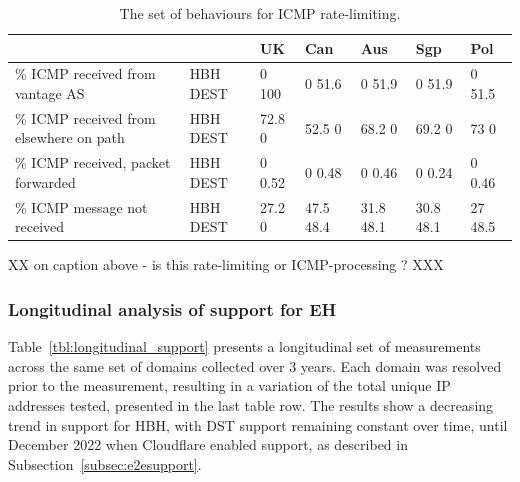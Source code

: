 \documentclass[conference]{IEEEtran}
\begin{document}
\begin{table}
\begin{tabular}{p{}|p{}|p{}|p{}|p{}|p{}|p{}}

\centering

                                           &             & UK        & Can       & Aus    & Sgp          & Pol     \\
                                           \hline

{\% ICMP received from vantage AS}        & {HBH DEST} & {0 100}  & {0 51.6}    & {0 51.9}    & {0 51.9}    & {0 51.5}  \\
\hline
{\% ICMP received from elsewhere on path}          & {HBH DEST} & {72.8 0} & {52.5 0}    & {68.2 0}    & {69.2 0}    & {73  0}    \\
\hline

{\% ICMP received, packet forwarded}          & {HBH DEST} & {0 0.52} & {0 0.48}    & {0 0.46}    & {0 0.24}    & {0 0.46}  \\
\hline

{\% ICMP message not received} & {HBH DEST} & {27.2 0} & {47.5 48.4} & {31.8 48.1} & {30.8 48.1} & {27 48.5} 
\end{tabular}
\caption{The set of behaviours for ICMP rate-limiting.}
\label{tbl:icmp_support_dst}
\end{table}



XX on caption above - is this rate-limiting or ICMP-processing ? XXX

\subsubsection{Longitudinal analysis of support for EH}

Table~\ref{tbl:longitudinal_support} presents a longitudinal set of measurements across the same set of domains collected over 3 years. Each domain was resolved prior to the measurement, resulting in a variation of the total unique IP addresses tested, presented in the last table row. The results show a decreasing trend in  support for HBH, with DST support remaining constant over time, until December 2022 when Cloudflare enabled support, as described in Subsection~\ref{subsec:e2esupport}.
\end{document}
